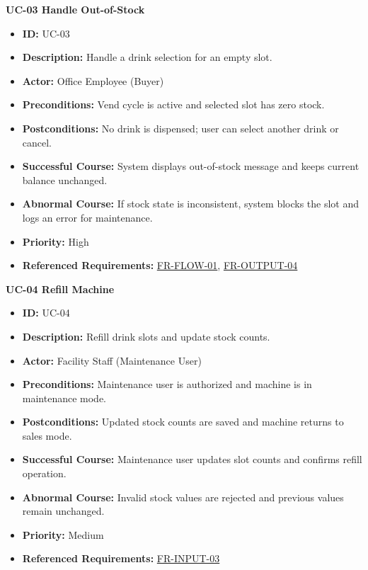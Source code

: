 \documentclass[a4paper,12pt]{article}
\newcommand{\reqref}[1]{\hyperlink{req:#1}{#1}}
\begin{document}
    \textbf{UC-03 Handle Out-of-Stock}
    \begin{itemize}
        \item \textbf{ID:} UC-03
        \item \textbf{Description:} Handle a drink selection for an empty slot.
        \item \textbf{Actor:} Office Employee (Buyer)
        \item \textbf{Preconditions:} Vend cycle is active and selected slot has zero stock.
        \item \textbf{Postconditions:} No drink is dispensed; user can select another drink or cancel.
        \item \textbf{Successful Course:} System displays out-of-stock message and keeps current balance unchanged.
        \item \textbf{Abnormal Course:} If stock state is inconsistent, system blocks the slot and logs an error for maintenance.
        \item \textbf{Priority:} High
        \item \textbf{Referenced Requirements:} \reqref{FR-FLOW-01}, \reqref{FR-OUTPUT-04}
    \end{itemize}

    \textbf{UC-04 Refill Machine}
    \begin{itemize}
        \item \textbf{ID:} UC-04
        \item \textbf{Description:} Refill drink slots and update stock counts.
        \item \textbf{Actor:} Facility Staff (Maintenance User)
        \item \textbf{Preconditions:} Maintenance user is authorized and machine is in maintenance mode.
        \item \textbf{Postconditions:} Updated stock counts are saved and machine returns to sales mode.
        \item \textbf{Successful Course:} Maintenance user updates slot counts and confirms refill operation.
        \item \textbf{Abnormal Course:} Invalid stock values are rejected and previous values remain unchanged.
        \item \textbf{Priority:} Medium
        \item \textbf{Referenced Requirements:} \reqref{FR-INPUT-03}
    \end{itemize}
\end{document}
